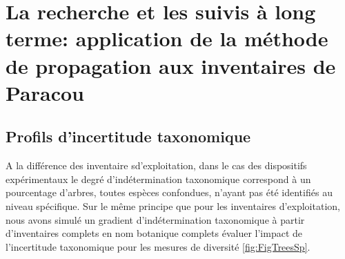 \documentclass[
  11pt,
  french,
  A4paper,
  extrafontsizes,onecolumn,openright
  ]{memoir}
\begin{document}
\section{La recherche et les suivis à long terme: application de la
méthode de propagation aux inventaires de
Paracou}\label{la-recherche-et-les-suivis-a-long-terme-application-de-la-methode-de-propagation-aux-inventaires-de-paracou}

\subsection{Profils d'incertitude
taxonomique}\label{profils-dincertitude-taxonomique}

A la différence des inventaire sd'exploitation, dans le cas des
dispositifs expérimentaux le degré d'indétermination taxonomique
correspond à un pourcentage d'arbres, toutes espèces confondues, n'ayant
pas été identifiés au niveau spécifique. Sur le même principe que pour
les inventaires d'exploitation, nous avons simulé un gradient
d'indétermination taxonomique à partir d'inventaires complets en nom
botanique complets évaluer l'impact de l'incertitude taxonomique pour
les mesures de diversité \ref{fig:FigTreesSp}.
\end{document}
